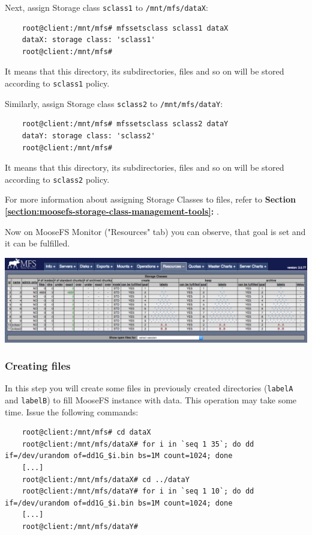 \documentclass[a4paper,11pt,english]{report}
\def\code#1{\texttt{#1}}
\begin{document}
			Next, assign Storage class \code{sclass1} to \code{/mnt/mfs/dataX}:
			\begin{lstlisting}
	root@client:/mnt/mfs# mfssetsclass sclass1 dataX
	dataX: storage class: 'sclass1'
	root@client:/mnt/mfs#
			\end{lstlisting}
			
			It means that this directory, its subdirectories, files and so on will be stored according to \code{sclass1} policy.
			
			Similarly, assign Storage class \code{sclass2} to \code{/mnt/mfs/dataY}:
					
			\begin{lstlisting}
	root@client:/mnt/mfs# mfssetsclass sclass2 dataY
	dataY: storage class: 'sclass2'
	root@client:/mnt/mfs#
			\end{lstlisting}
			
			It means that this directory, its subdirectories, files and so on will be stored according to \code{sclass2} policy.
			
			
	
			
			For more information about assigning Storage Classes to files, refer to \textbf{Section \ref{section:moosefs-storage-class-management-tools}:  }.
			
			Now on MooseFS Monitor ("Resources" tab) you can observe, that goal is set and it can be fulfilled.
			
			\bigskip
			\includegraphics[width=1.0\textwidth]{images/cgi_resources1.png}
				
				\subsubsection{Creating files}
				In this step you will create some files in previously created directories (\code{labelA} and \code{labelB}) to fill MooseFS instance with data. This operation may take some time. Issue the following commands:
				
				\begin{lstlisting}
	root@client:/mnt/mfs# cd dataX
	root@client:/mnt/mfs/dataX# for i in `seq 1 35`; do dd if=/dev/urandom of=dd1G_$i.bin bs=1M count=1024; done
	[...]
	root@client:/mnt/mfs/dataX# cd ../dataY
	root@client:/mnt/mfs/dataY# for i in `seq 1 10`; do dd if=/dev/urandom of=dd1G_$i.bin bs=1M count=1024; done
	[...]
	root@client:/mnt/mfs/dataY#
				\end{lstlisting}
				
\end{document}
